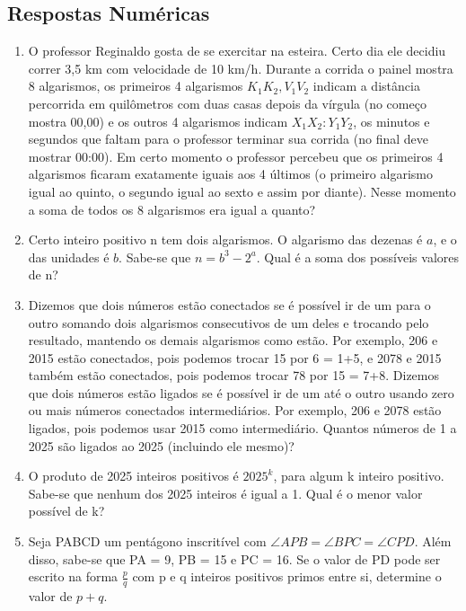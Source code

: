 \documentclass[12pt]{article}
\begin{document}
    \subsection{Respostas Numéricas}
      \begin{enumerate}[label=\textbf{\arabic*.}, start=16]
        \item O professor Reginaldo gosta de se exercitar na esteira. Certo dia ele decidiu correr 3,5 km com velocidade de 10 km/h. Durante a corrida o painel mostra 
          8 algarismos, os primeiros 4 algarismos \(K_1K_2,V_1V_2\) indicam a distância percorrida em quilômetros com duas casas depois da vírgula (no começo mostra 00,00) e os outros
          4 algarismos indicam \(X_1X_2:Y_1Y_2\), os minutos e segundos que faltam para o professor terminar sua corrida (no final deve mostrar 00:00). Em certo momento o professor
          percebeu que os primeiros 4 algarismos ficaram exatamente iguais aos 4 últimos (o primeiro algarismo igual ao quinto, o segundo igual ao sexto e assim por diante). Nesse
          momento a soma de todos os 8 algarismos era igual a quanto?
        \item Certo inteiro positivo n tem dois algarismos. O algarismo das dezenas é \(a\), e o das unidades é \(b\). Sabe-se que \(n = b^3 - 2^a\). Qual é a soma dos possíveis
          valores de n?
        \item Dizemos que dois números estão conectados se é possível ir de um para o outro somando dois algarismos consecutivos de um deles e trocando pelo resultado, mantendo
          os demais algarismos como estão. Por exemplo, 206 e 2015 estão conectados, pois podemos trocar 15 por 6 = 1+5, e 2078 e 2015 também estão conectados, pois podemos trocar
          78 por 15 = 7+8. Dizemos que dois números estão ligados se é possível ir de um até o outro usando zero ou mais números conectados intermediários. Por exemplo, 206 e 2078
          estão ligados, pois podemos usar 2015 como intermediário. Quantos números de 1 a 2025 são ligados ao 2025 (incluindo ele mesmo)?
        \item O produto de 2025 inteiros positivos é \(2025^k\), para algum k inteiro positivo. Sabe-se que nenhum dos 2025 inteiros é igual a 1. Qual é o menor valor possível de k?
        \item Seja PABCD um pentágono inscritível com \(\angle APB = \angle BPC = \angle CPD\). Além disso, sabe-se que PA = 9, PB = 15 e PC = 16. Se o valor de PD pode ser escrito
          na forma \(\tfrac{p}{q}\) com p e q inteiros positivos primos entre si, determine o valor de \(p+q\).
      \end{enumerate}
  \clearpage
\end{document}
